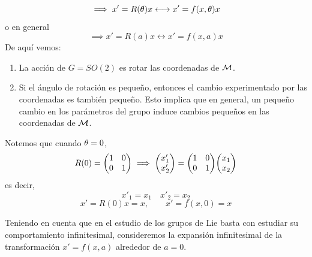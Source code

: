 \begin{equation}
  \implies x'=R(\theta ) x \longleftrightarrow x'=f(x,\theta )x
\end{equation}
o en general
\begin{equation}
  \implies x'=R(a ) x \longleftrightarrow x'=f(x,a )x
\end{equation}
De aquí vemos:
\begin{enumerate}
	\item La acción de $G=SO(2)$ es rotar las coordenadas de $\mathcal{M}$.
	\item Si el ángulo de rotación es pequeño, entonces el cambio experimentado por las coordenadas es también pequeño. Esto implica que en general, un pequeño cambio en los parámetros del grupo induce cambios pequeños en las coordenadas de $\mathcal{M}$.
\end{enumerate}

Notemos que cuando $\theta =0$,
\begin{equation}
  R(0)=\mqty(1&0\\0&1)\implies \mqty(x'_1\\x'_2)=\mqty(1&0\\0&1)\mqty(x_1\\x_2)
\end{equation}
es decir,
\begin{equation}
  x'_1=x_1\quad x'_2=x_2
\end{equation}
\begin{equation}
  x'=R(0)x=x,\qquad  x'=f(x,0)=x
\end{equation}




Teniendo en cuenta que en el estudio de los grupos de Lie basta con estudiar su comportamiento infinitesimal, consideremos la expansión infinitesimal de la transformación $x'=f(x,a)$ alrededor de $a=0$.

